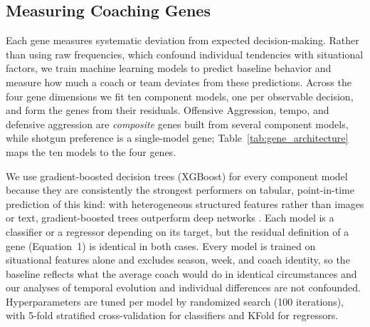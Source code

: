 \documentclass[USenglish]{article}
\theoremstyle{dgthm}
\theoremstyle{dgdef}
\begin{document}
\subsection{Measuring Coaching Genes}
\label{sec:genes}

Each gene measures systematic deviation from expected decision-making. Rather than using raw frequencies, which confound individual tendencies with situational factors, we train machine learning models to predict baseline behavior and measure how much a coach or team deviates from these predictions. Across the four gene dimensions we fit ten component models, one per observable decision, and form the genes from their residuals. Offensive Aggression, tempo, and defensive aggression are \emph{composite} genes built from several component models, while shotgun preference is a single-model gene; Table~\ref{tab:gene_architecture} maps the ten models to the four genes.

We use gradient-boosted decision trees (XGBoost) for every component model because they are consistently the strongest performers on tabular, point-in-time prediction of this kind: with heterogeneous structured features rather than images or text, gradient-boosted trees outperform deep networks \citep{chen2016,grinsztajn2022}. Each model is a classifier or a regressor depending on its target, but the residual definition of a gene (Equation~1) is identical in both cases. Every model is trained on situational features alone and excludes season, week, and coach identity, so the baseline reflects what the average coach would do in identical circumstances and our analyses of temporal evolution and individual differences are not confounded. Hyperparameters are tuned per model by randomized search (100 iterations), with 5-fold stratified cross-validation for classifiers and KFold for regressors.
\end{document}

